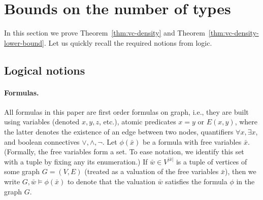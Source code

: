 \section{Bounds on the number of types}\label{sec:types}

In this section we prove Theorem~\ref{thm:vc-density} and Theorem~\ref{thm:vc-density-lower-bound}. Let us quickly recall the required notions from
logic. 
%
%
%
\subsection{Logical notions}

\paragraph{Formulas.}
All formulas in this paper are first order formulas on graph,
i.e., they are built using variables (denoted $x,y,z$, etc.),
atomic predicates $x=y$ or $E(x,y)$,
where the latter denotes the existence of an edge between two nodes, quantifiers $\forall x,\exists x$, and boolean connectives $\lor,\land,\neg$. 
Let $\phi(\bar x)$ be a formula with free variables 
$\bar x$. (Formally, the free variables form a set.
To ease notation, we identify this set with a tuple by fixing any its enumeration.)
If $\bar w\in V^{|\bar x|}$ is a tuple of vertices of some graph $G=(V,E)$ (treated as a valuation of the free variables $\bar x$), then we write $G,\bar w\models \phi(\bar x)$
to denote that the valuation $\bar w$ satisfies the formula $\phi$ in the graph $G$.
%

